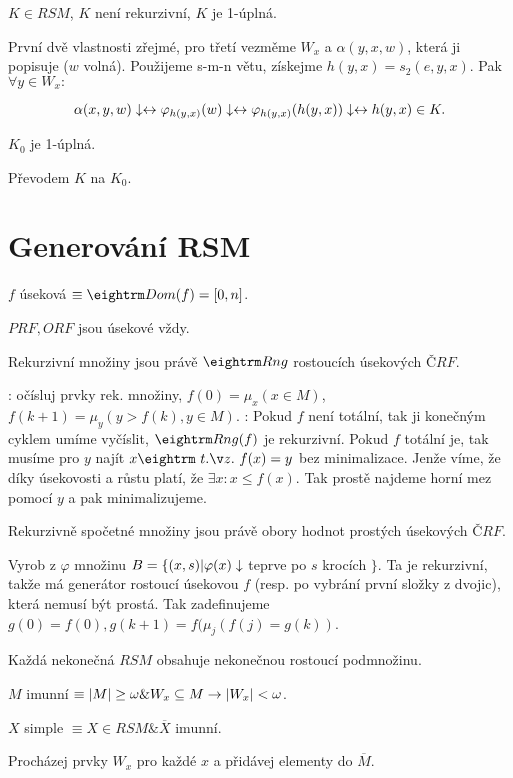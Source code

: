  $K \in RSM$, $K$ není rekurzivní, $K$ je 1-úplná.

\prf{} První dvě vlastnosti zřejmé, pro třetí vezměme $W_x$ a $\alpha(y,x,w)$,
která ji popisuje ($w$ volná). Použijeme s-m-n větu, získejme $h(y,x) = s_2(e,y,x)$. Pak
$\forall y \in W_x:$

$$ \alpha(x,y,w)\downarrow \leftrightarrow \varphi_{h(y,x)}(w)\downarrow \leftrightarrow  \varphi_{h(y,x)}(h(y,x))\downarrow \leftrightarrow h(y,x) \in K.$$

 $K_0$ je 1-úplná.

\prf{} Převodem $K$ na $K_0$.

\section{Generování RSM}

\dfn{} $f$ úseková $\equiv \dom(f) = [0,n]$.

\obs{} $PRF, ORF$ jsou úsekové vždy.

 Rekurzivní množiny jsou právě $\rng$ rostoucích úsekových $ČRF$. 

\prf{}

\itemize\ibull
\: \uv{$\then$}: očísluj prvky rek. množiny, $f(0) = \mu_x(x \in M)$, $f(k+1) = \mu_y(y > f(k), y \in M)$.
\: \uv{$\leftarrow$}: Pokud $f$ není totální, tak ji konečným cyklem umíme
vyčíslit, $\rng(f)$ je rekurzivní.  Pokud $f$ totální je, tak musíme pro $y$
najít $x \st f(x) = y$ bez minimalizace. Jenže víme, že díky úsekovosti a růstu
platí, že $\exists x: x \le f(x)$. Tak prostě najdeme horní mez pomocí $y$ a
pak minimalizujeme.
\endlist

\thm{} Rekurzivně spočetné množiny jsou právě obory hodnot prostých úsekových $ČRF$.

\prf{} Vyrob z $\varphi$ množinu $B = \{(x,s) | \varphi(x) \downarrow$ teprve po $s$ krocích $\}$.
Ta je rekurzivní, takže má generátor rostoucí úsekovou $f$ (resp. po vybrání první složky z dvojic),
která nemusí být prostá. Tak zadefinujeme $g(0) = f(0), g(k+1) = f(\mu_j(f(j) = g(k))$.

\thm{} Každá nekonečná $RSM$ obsahuje nekonečnou rostoucí podmnožinu.
 

\dfn{} $M$ imunní $\equiv |M| \ge \omega \& W_x \subseteq M \rightarrow |W_x| < \omega$. 

\dfn{} $X$ simple $\equiv X \in RSM \& \overline{X}$ imunní.

 Procházej prvky $W_x$ pro každé $x$ a přidávej elementy do $\overline{M}$.

